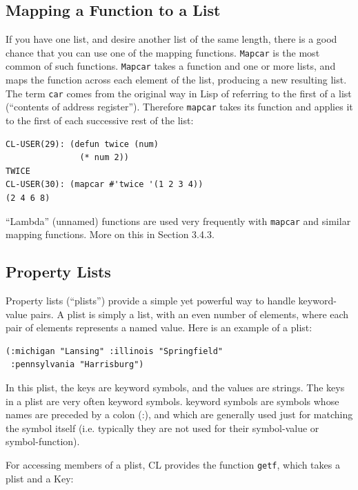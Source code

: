 \subsection{Mapping a Function to a List}

If you have one list, and desire another list of the same length, there is a good chance that
you can use one of the mapping functions. \texttt{Mapcar} is the most common of such functions.
\texttt{Mapcar} takes a function and one or more lists, and maps the function across each element
of the list, producing a new resulting list. The term \texttt{car} comes from the original way in
Lisp of referring to the first of a list (``contents of address register''). Therefore \texttt{mapcar}
takes its function and applies it to the first of each successive rest of the list:

\begin{verbatim}
CL-USER(29): (defun twice (num)
               (* num 2))
TWICE
CL-USER(30): (mapcar #'twice '(1 2 3 4))
(2 4 6 8)
\end{verbatim}

``Lambda'' (unnamed) functions are used very frequently with \texttt{mapcar} and similar mapping
functions. More on this in Section 3.4.3.

\subsection{Property Lists}

Property lists (``plists'') provide a simple yet powerful way to handle keyword-value pairs.
A plist is simply a list, with an even number of elements, where each pair of elements
represents a named value. Here is an example of a plist:

\begin{verbatim}
(:michigan "Lansing" :illinois "Springfield"
 :pennsylvania "Harrisburg")
\end{verbatim}

In this plist, the keys are keyword symbols, and the values are strings. The keys in a plist
are very often keyword symbols. keyword symbols are symbols whose names are preceded by
a colon (:), and which are generally used just for matching the symbol itself (i.e. typically
they are not used for their symbol-value or symbol-function).

For accessing members of a plist, CL provides the function \texttt{getf}, which takes a plist
and a Key:

